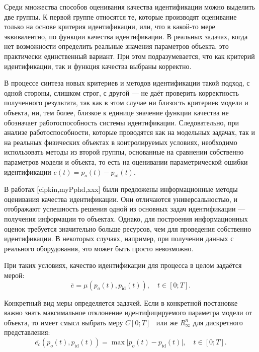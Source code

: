 Среди множества способов оценивания качества идентификации
можно выделить две группы.
К первой группе относятся те, которые производят оценивание
только на основе критерия идентификации, или,
что в какой-то мере эквивалентно, по функции качества идентификации.
В реальных задачах, когда нет возможности определить реальные значения
параметров объекта, это практически единственный вариант.
При этом подразумевается, что как критерий идентификации, так и
функция качества выбраны корректно.

В процессе синтеза новых критериев и методов идентификации
такой подход, с одной стороны, слишком строг,
с другой --- не даёт проверить корректность полученного результата,
так как в этом случае ни близость критериев модели и объекта,
ни, тем более, близкое к единице значение функции качества не
обозначает работоспособность системы идентификации.
Следовательно, при анализе работоспособности,
которые проводятся как на модельных задачах,
так и на реальных физических объектах в контролируемых
условиях, необходимо использовать методы из второй группы,
основанные на сравнении собственно параметров модели и объекта,
то есть на оценивании параметрической
ошибки идентификации $e(t)=p_o(t)-p_\mathrm{id}(t)$.

В работах [cipkin,myPphd,xxx] были предложены информационные методы
оценивания качества идентификации.
Они отличаются универсальностью, и отображают
успешность решения одной из основных задач
идентификации --- получения информации то объектах.
Однако, для построения информационных оценок
требуется значительно больше ресурсов, чем
для проведения собственно идентификации. В некоторых случаях,
например, при получении данных с реального оборудования,
это может быть просто невозможно.



При таких условиях, качество идентификации для процесса
в целом задаётся мерой:
%
\[
  \overline{e} = \mu( p_o(t), p_\mathrm{id}(t) ),
  \quad
  t \in [0;T].
\]

Конкретный вид меры определяется задачей.
Если в конкретной постановке важно знать максимальное
отклонение идентифицируемого параметра модели от объекта,
то имеет смысл выбрать меру $C[0;T]$~\cite{kolmogorov_fun_ana} или же
$R_{\infty}^n$ для дискретного представления:
%
\begin{equation}
  \overline{e_c}(p_o(t),p_\mathrm{id}(t))
  =
  \max \big| p_o(t)-p_\mathrm{id}(t) \big|,
  \quad
  t \in [0;T].
  \label{atu:eq:e_c}
\end{equation}


